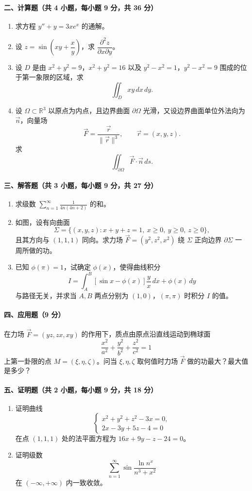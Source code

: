 \paragraph{二、计算题（共 4 小题，每小题 9 分，共 36 分）}
\begin{enumerate}
  \item 求方程 $y''+y=3xe^x$ 的通解。
  \item 设 $z=\sin\left(xy+\dfrac{x}{y}\right)$，求 $\dfrac{\partial^2z}{\partial x\partial y}$。
  \item 设 $D$ 是由 $x^2+y^2=9$，$x^2+y^2=16$ 以及 $y^2-x^2=1$，$y^2-x^2=9$ 围成的位于第一象限的区域，求
  \[
    \iint_D xy\,dx\,dy.
  \]
  \item 设 $\Omega\subset\mathbb R^3$ 以原点为内点，且边界曲面 $\partial\Omega$ 光滑，又设边界曲面单位外法向为 $\vec n$，向量场
  \[
    \vec F=\frac{\vec r}{\|\vec r\|^3},\qquad \vec r=(x,y,z).
  \]
  求
  \[
    \iint_{\partial\Omega}\vec F\cdot\vec n\,ds.
  \]
\end{enumerate}

\paragraph{三、解答题（共 3 小题，每小题 9 分，共 27 分）}
\begin{enumerate}
  \item 求级数 $\displaystyle \sum_{n=1}^\infty \frac1{4n(4n+2)}$ 的和。
  \item 如图，设有向曲面
  \[
    \Sigma=\{(x,y,z):x+y+z=1,\ x\ge 0,\ y\ge 0,\ z\ge 0\},
  \]
  且其方向与 $(1,1,1)$ 同向。求力场 $\vec F=(y^2,z^2,x^2)$ 绕 $\Sigma$ 正向边界 $\partial\Sigma$ 一周所做的功。
  \item 已知 $\phi(\pi)=1$，试确定 $\phi(x)$，使得曲线积分
  \[
    I=\int_A^B \left[\sin x-\phi(x)\right]\frac{y}{x}\,dx+\phi(x)\,dy
  \]
  与路径无关，并求当 $A,B$ 两点分别为 $(1,0)$，$(\pi,\pi)$ 时积分 $I$ 的值。
\end{enumerate}

\paragraph{四、应用题（9 分）}
在力场 $\vec F=(yz,zx,xy)$ 的作用下，质点由原点沿直线运动到椭球面
\[
  \frac{x^2}{a^2}+\frac{y^2}{b^2}+\frac{z^2}{c^2}=1
\]
上第一卦限的点 $M=(\xi,\eta,\zeta)$。问当 $\xi,\eta,\zeta$ 取何值时力场 $\vec F$ 做的功最大？最大值是多少？

\paragraph{五、证明题（共 2 小题，每小题 9 分，共 18 分）}
\begin{enumerate}
  \item 证明曲线
  \[
    \begin{cases}
      x^2+y^2+z^2-3x=0,\\
      2x-3y+5z-4=0
    \end{cases}
  \]
  在点 $(1,1,1)$ 处的法平面方程为 $16x+9y-z-24=0$。
  \item 证明级数
  \[
    \sum_{n=1}^\infty \sin\frac{\ln n^x}{n^3+x^2}
  \]
  在 $(-\infty,+\infty)$ 内一致收敛。
\end{enumerate}

